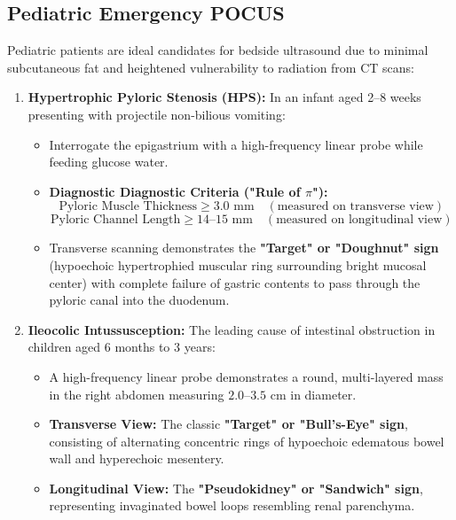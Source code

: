 \documentclass[11pt,a4paper]{article}
\begin{document}
\subsection{Pediatric Emergency POCUS}
Pediatric patients are ideal candidates for bedside ultrasound due to minimal subcutaneous fat and heightened vulnerability to radiation from CT scans:
\begin{enumerate}[leftmargin=2em]
    \item \textbf{Hypertrophic Pyloric Stenosis (HPS):}
    In an infant aged 2--8 weeks presenting with projectile non-bilious vomiting:
    \begin{itemize}
        \item Interrogate the epigastrium with a high-frequency linear probe while feeding glucose water.
        \item \textbf{Diagnostic Diagnostic Criteria ("Rule of $\pi$"):}
        \begin{equation}
            \text{Pyloric Muscle Thickness} \ge 3.0\text{ mm} \quad (\text{measured on transverse view})
        \end{equation}
        \begin{equation}
            \text{Pyloric Channel Length} \ge 14\text{--}15\text{ mm} \quad (\text{measured on longitudinal view})
        \end{equation}
        \item Transverse scanning demonstrates the \textbf{"Target" or "Doughnut" sign} (hypoechoic hypertrophied muscular ring surrounding bright mucosal center) with complete failure of gastric contents to pass through the pyloric canal into the duodenum.
    \end{itemize}
    \item \textbf{Ileocolic Intussusception:}
    The leading cause of intestinal obstruction in children aged 6 months to 3 years:
    \begin{itemize}
        \item A high-frequency linear probe demonstrates a round, multi-layered mass in the right abdomen measuring $2.0\text{--}3.5\text{ cm}$ in diameter.
        \item \textbf{Transverse View:} The classic \textbf{"Target" or "Bull's-Eye" sign}, consisting of alternating concentric rings of hypoechoic edematous bowel wall and hyperechoic mesentery.
        \item \textbf{Longitudinal View:} The \textbf{"Pseudokidney" or "Sandwich" sign}, representing invaginated bowel loops resembling renal parenchyma.

\end{itemize}
\end{enumerate}
\end{document}
